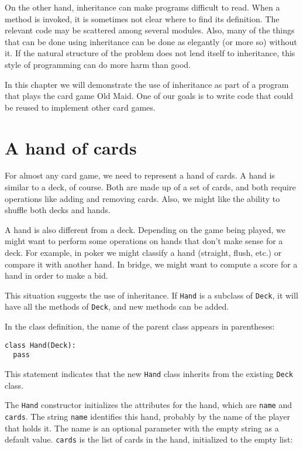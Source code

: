 On the other hand, inheritance can make programs difficult to read.
When a method is invoked, it is sometimes not clear where to find its
definition.  The relevant code may be scattered among several modules.
Also, many of the things that can be done using inheritance can be
done as elegantly (or more so) without it.  If the natural
structure of the problem does not lend itself to inheritance, this
style of programming can do more harm than good.

In this chapter we will demonstrate the use of inheritance as part of
a program that plays the card game Old Maid.  One of our goals is to
write code that could be reused to implement other card games.


\section{A hand of cards}

For almost any card game, we need to represent a hand of cards.
A hand is similar to a deck, of course.  Both are made up of
a set of cards, and both require operations like adding and
removing cards.  Also, we might like the ability to shuffle
both decks and hands.

A hand is also different from a deck.  Depending on the game being
played, we might want to perform some operations on hands that
don't make sense for a deck.  For example, in poker we might classify
a hand (straight, flush, etc.) or compare it with another hand.  In
bridge, we might want to compute a score for a hand in order to make
a bid.

This situation suggests the use of inheritance.  If {\tt Hand} is a
subclass of {\tt Deck}, it will have all the methods
of {\tt Deck}, and new methods can be added.


In the class definition, the name of the parent class appears
in parentheses:

\beforeverb
\begin{verbatim}
class Hand(Deck):
  pass
\end{verbatim}
\afterverb
%
This statement indicates that the new {\tt Hand} class inherits from
the existing {\tt Deck} class.

The {\tt Hand} constructor initializes the attributes
for the hand, which are {\tt name} and {\tt cards}.  The string {\tt name}
identifies this hand, probably by the name of
the player that holds it.  The name is an optional parameter with
the empty string as a default value.
{\tt cards} is the list of cards in
the hand, initialized to the empty list:

